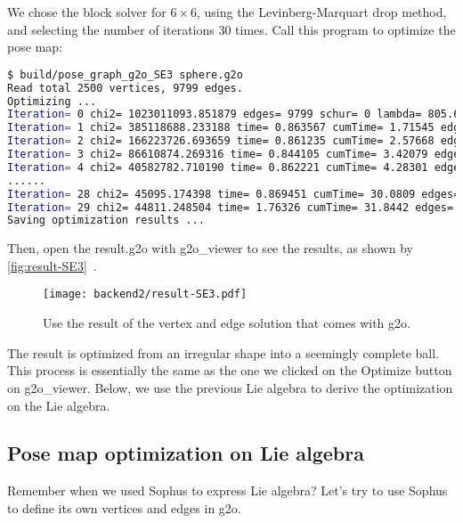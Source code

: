 We chose the block solver for $6\times6$, using the Levinberg-Marquart drop method, and selecting the number of iterations 30 times. Call this program to optimize the pose map:
\begin{lstlisting}[language=sh, caption=terminal input:]
$ build/pose_graph_g2o_SE3 sphere.g2o
Read total 2500 vertices, 9799 edges.
Optimizing ...
Iteration= 0 chi2= 1023011093.851879 edges= 9799 schur= 0 lambda= 805.622433 levenbergIter= 1
Iteration= 1 chi2= 385118688.233188 time= 0.863567 cumTime= 1.71545 edges= 9799 schur= 0 lambda= 537.081622 levenbergIter= 1
Iteration= 2 chi2= 166223726.693659 time= 0.861235 cumTime= 2.57668 edges= 9799 schur= 0 lambda= 358.054415 levenbergIter= 1
Iteration= 3 chi2= 86610874.269316 time= 0.844105 cumTime= 3.42079 edges= 9799 schur= 0 lambda= 238.702943 levenbergIter= 1
Iteration= 4 chi2= 40582782.710190 time= 0.862221 cumTime= 4.28301 edges= 9799 schur= 0 lambda= 159.135295 levenbergIter= 1
......
Iteration= 28 chi2= 45095.174398 time= 0.869451 cumTime= 30.0809 edges= 9799 schur= 0 lambda= 0.003127 levenbergIter= 1
Iteration= 29 chi2= 44811.248504 time= 1.76326 cumTime= 31.8442 edges= 9799 schur= 0 lambda= 0.003785 levenbergIter= 2
Saving optimization results ...
\end{lstlisting}

Then, open the result.g2o with g2o\_viewer to see the results, as shown by \autoref{fig:result-SE3}~.
\begin{figure}[!ht]
\centering
\texttt{[image: backend2/result-SE3.pdf]}
\caption{Use the result of the vertex and edge solution that comes with g2o. }
\label{fig:result-SE3}
\end{figure}

The result is optimized from an irregular shape into a seemingly complete ball. This process is essentially the same as the one we clicked on the Optimize button on g2o\_viewer. Below, we use the previous Lie algebra to derive the optimization on the Lie algebra.

\subsection{Pose map optimization on Lie algebra}
Remember when we used Sophus to express Lie algebra? Let's try to use Sophus to define its own vertices and edges in g2o.

